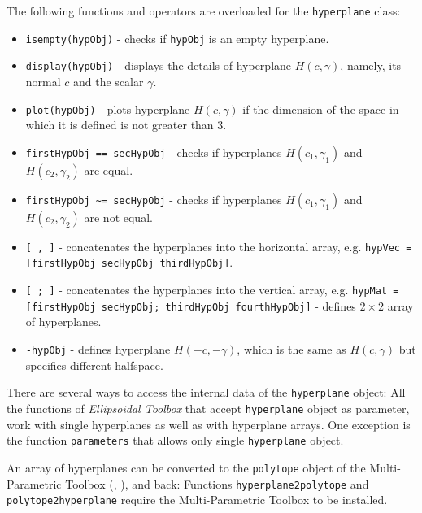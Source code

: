 The following functions and operators are overloaded for the
{\tt hyperplane} class:
\begin{itemize}
\item {\tt isempty(hypObj)} - checks if {\tt hypObj} is an empty hyperplane.
\item {\tt display(hypObj)} - displays the details of hyperplane $H(c,\gamma)$,
namely, its normal $c$ and the scalar $\gamma$.
\item {\tt plot(hypObj)} - plots hyperplane $H(c,\gamma)$ if the dimension of the
space in which it is defined  is not greater than 3.
\item {\tt firstHypObj == secHypObj} - checks if hyperplanes $H(c_1,\gamma_1)$ and
$H(c_2,\gamma_2)$ are equal.
\item {\tt firstHypObj \~{ }= secHypObj} - checks if hyperplanes $H(c_1,\gamma_1)$ and
$H(c_2,\gamma_2)$ are not equal.
\item {\tt [ , ]} - concatenates the hyperplanes into the horizontal array, e.g.
{\tt hypVec = [firstHypObj secHypObj thirdHypObj]}.
\item {\tt [ ; ]} - concatenates the hyperplanes into the vertical array, e.g.
{\tt hypMat = [firstHypObj secHypObj; thirdHypObj fourthHypObj]} - defines $2\times 2$ array of hyperplanes.
\item {\tt -hypObj} - defines hyperplane $H(-c,-\gamma)$, which is the same
as $H(c,\gamma)$ but specifies different halfspace.
\end{itemize}

There are several ways to access the internal data of the {\tt hyperplane}
object:
All the functions of {\it Ellipsoidal Toolbox} that accept {\tt hyperplane}
object as parameter, work with single hyperplanes as well as with hyperplane
arrays. One exception is the function {\tt parameters} that allows only
single {\tt hyperplane} object.

An array of hyperplanes can be converted to the {\tt polytope} object of the
Multi-Parametric Toolbox (\cite{morari}, \cite{mpt}), and back:
Functions {\tt hyperplane2polytope} and {\tt polytope2hyperplane} require
the Multi-Parametric Toolbox to be installed.

